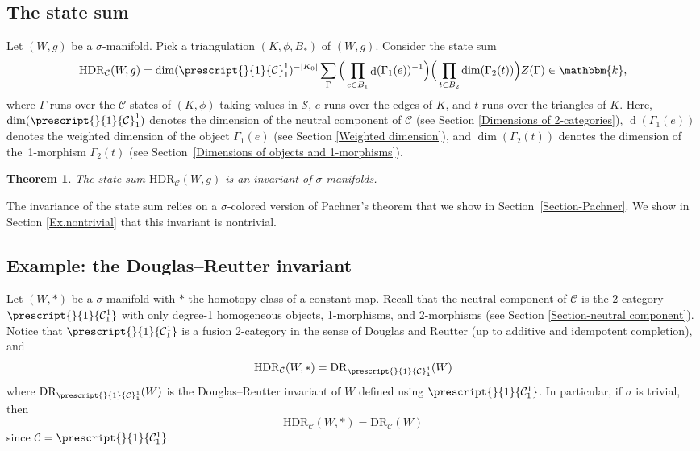 \documentclass[a4paper, oneside]{amsart}
\DeclareMathOperator{\wdim}{d}
\numberwithin{equation}{subsection}
\theoremstyle{referencedlemma}
\theoremstyle{plain} %
\newtheorem{thm}{Theorem}
\theoremstyle{remark}
\begin{document}
\subsection{The state sum}
Let $(W, g)$ be a $\sigma$-manifold. Pick a triangulation $(K,\phi, B_*)$ of $(W,g)$.  Consider the state sum
\begin{align*}
\mathrm{HDR}_\mathcal{C}(W,g) = \dim(\prescript{}{1}{\mathcal{C}}_1^1)^{-\lvert K_0\rvert} \sum_{\Gamma} \Big(\prod_{e \in B_1} \wdim(\Gamma_1(e))^{-1}\Big) \Big(\prod_{t \in B_2}\dim(\Gamma_2(t)) \Big) Z(\Gamma) \in \mathbbm{k},
\end{align*}
where $\Gamma$ runs over the $\mathcal{C}$-states of $(K,\phi)$ taking values in $\mathcal{S}$, $e$ runs over the edges of $K$, and $t$ runs over the triangles of $K$. Here, $\dim(\prescript{}{1}{\mathcal{C}}_1^1)$ denotes the dimension of the neutral component of $\mathcal{C}$ (see Section \ref{Dimensions of 2-categories}), $\wdim(\Gamma_1(e))$ denotes the weighted dimension of the object $\Gamma_1(e)$ (see Section \ref{Weighted dimension}), and $\dim(\Gamma_2(t))$ denotes the dimension of the~1-morphism $\Gamma_2(t)$ (see Section~\ref{Dimensions of objects and 1-morphisms}). 

\begin{thm}\label{maintheorem}
The state sum $\mathrm{HDR}_\mathcal{C}(W,g)$ is an invariant of $\sigma$-manifolds. 
\end{thm}

The invariance of the state sum relies on a $\sigma$-colored version of Pachner's theorem that we show in Section~\ref{Section-Pachner}.  We show in Section \ref{Ex.nontrivial} that this invariant is nontrivial. 

\subsection{Example: the Douglas--Reutter invariant}\label{Ex.Douglas-Reutter}

Let $(W,*)$ be a $\sigma$-manifold with $*$ the homotopy class of a constant map. Recall that the neutral component of $\mathcal{C}$ is the 2-category $\prescript{}{1}{\mathcal{C}_1^1}$ with only degree-1 homogeneous objects, 1-morphisms,  and 2-morphisms (see Section \ref{Section-neutral component}).  Notice that $\prescript{}{1}{\mathcal{C}_1^1}$ is a fusion 2-category in the sense of Douglas and Reutter (up to additive and idempotent completion), and
$$
\mathrm{HDR}_\mathcal{C}(W,*) = \mathrm{DR}_{\prescript{}{1}{\mathcal{C}}^1_1}(W)
$$
where $\mathrm{DR}_{\prescript{}{1}{\mathcal{C}}^1_1}(W)$ is the Douglas--Reutter invariant of $W$ defined using $\prescript{}{1}{\mathcal{C}_1^1}$.  In particular, if $\sigma$ is trivial, then 
$$
\mathrm{HDR}_\mathcal{C}(W,*) = \mathrm{DR}_{\mathcal{C}}(W)
$$
since $\mathcal{C} = \prescript{}{1}{\mathcal{C}_1^1}$.
\end{document}
